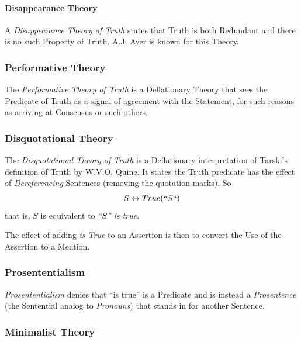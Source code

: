 \paragraph{Disappearance Theory}\label{sec:disappearance_theory}\hfill

A \emph{Disappearance Theory of Truth} states that Truth is both
Redundant and there is no such Property of Truth. A.J. Ayer is known
for this Theory.



\subsubsection{Performative Theory}\label{sec:performative_theory}

The \emph{Performative Theory of Truth} is a Deflationary Theory that
sees the Predicate of Truth as a signal of agreement with the
Statement, for such reasons as arriving at Consensus or such others.



\subsubsection{Disquotational Theory}\label{sec:disquotational_theory}

The \emph{Disquotational Theory of Truth} is a Deflationary
interpretation of Tarski's definition of Truth by W.V.O. Quine. It
states the Truth predicate has the effect of \emph{Dereferencing}
Sentences (removing the quotation marks). So
\[
    S \leftrightarrow True(``S``)
\]
that is, $S$ is equivalent to \emph{``$S$'' is true}.

The effect of adding \emph{is True} to an Assertion is then to convert
the Use of the Assertion to a Mention.



\subsubsection{Prosententialism}\label{sec:prosententialism}

\emph{Prosententialism} denies that ``is true'' is a Predicate and is
instead a \emph{Prosentence} (the Sentential analog to
\emph{Pronouns}) that stands in for another Sentence.



\subsubsection{Minimalist Theory}\label{sec:minimalist_theory}


